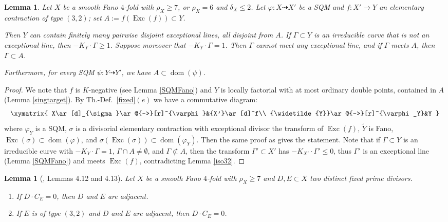\documentclass[a4paper,12pt]{amsart}
\newtheorem{lemma}[thm]{Lemma}
\theoremstyle{definition}
\numberwithin{figure}{section}
\numberwithin{table}{section}
\newcommand{\ph}{\varphi}
\newcommand{\w}{\widetilde}
\newcommand{\dom}{\operatorname{dom}}
\newcommand{\Exc}{\operatorname{Exc}}
\begin{document}
\begin{lemma}\label{target}
  Let $X$ be a smooth Fano $4$-fold with $\rho_X\geq 7$,  or $\rho_X=6$ and $\delta_X\leq 2$. Let $\ph\colon X\dasharrow X'$ be a SQM and $f\colon X'\to Y$ an elementary contraction of type $(3,2)$; set $A:=f(\Exc(f))\subset Y$.
 
 Then
  $Y$ can contain finitely many pairwise disjoint exceptional lines, all disjoint from $A$. If $\Gamma\subset Y$ is an irreducible curve that is not an exceptional line, then $-K_Y\cdot \Gamma\geq 1$. Suppose moreover that
  $-K_Y\cdot \Gamma=1$. Then $\Gamma$ cannot meet any exceptional line, and if $\Gamma$ meets $A$, then $\Gamma\subset A$.

Furthermore,  for every SQM $\psi\colon Y\dasharrow Y'$, we have $A\subset\dom(\psi)$.
      \end{lemma}
      \begin{proof}
        We note that $f$ is $K$-negative (see Lemma \ref{SQMFano}) and $Y$
is locally factorial with
    at most ordinary double points, contained in $A$ (Lemma \ref{singtarget}).
        By Th.-Def.~\ref{fixed}$(e)$ we have a commutative diagram:
        $$\xymatrix{ X\ar[d]_{\sigma}\ar@{-->}[r]^{\ph}&{X'}\ar[d]^f\\
          {\w{Y}}\ar@{-->}[r]^{\ph_Y}&Y
          }$$
          where $\ph_Y$ is a SQM, $\sigma$ is a divisorial elementary contraction with exceptional divisor the transform of $\Exc(f)$, $\w{Y}$ is Fano, $\Exc(\sigma)\subset\dom(\ph)$, and $\sigma(\Exc(\sigma))\subset\dom(\ph_Y)$.
Then the same proof as \cite[proof of Lemma 5.48]{3folds}
gives the statement.  Note that if   $\Gamma\subset Y$ is an irreducible curve with $-K_Y\cdot\Gamma=1$, $\Gamma\cap A\neq\emptyset$, and $\Gamma\not\subset A$, then the transform $\Gamma'\subset X'$ has $-K_{X'}\cdot\Gamma'\leq 0$, thus $\Gamma'$ is an exceptional line (Lemma \ref{SQMFano}) and meets $\Exc(f)$, contradicting   Lemma \ref{iso32}.  \end{proof}
\begin{lemma}[\cite{small}, Lemmas 4.12 and 4.13]\label{EF}
Let $X$ be a smooth Fano $4$-fold with $\rho_X\geq 7$ and $D,E\subset X$ two
distinct fixed prime divisors.
\begin{enumerate}[$(a)$]
  \item
If $D\cdot C_E=0$, then $D$ and $E$ are adjacent.
\item
  If $E$ is of type $(3,2)$ and $D$ and $E$ are adjacent, then $D\cdot C_E=0$.
\end{enumerate}\end{lemma}
\end{document}
